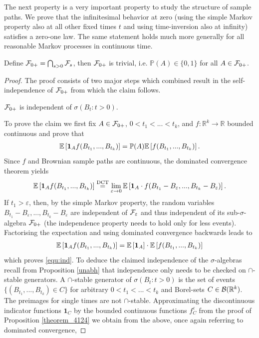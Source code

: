 The next property is a very important property to study the structure of sample paths. We prove that the infinitesimal behavior at zero (using the simple Markov property also at all other fixed times $t$ and using time-inversion also at infinity) satisfies a zero-one law. The same statement holds much more generally for all reasonable Markov processes in continuous time.
\begin{laussagewerkzeug}
\begin{theorem}
	Define $\mathcal{F}_{0+} =\bigcap_{s>0}\mathcal{F}_s$, then $\mathcal{F}_{0+}$ is trivial, i.e. $\mathbb{P}(A)\in\{0,1\}$ for all $A\in \mathcal{F}_{0+}$.
\end{theorem}
\end{laussagewerkzeug}
\begin{proof}[Proof]
	The proof consists of two major steps which combined result in the self-independence of $\mathcal{F}_{0+}$ from which the claim follows.
	\begin{lstep}
		$\mathcal{F}_{0+}$ is independent of $\sigma(B_t:t>0)$.
	\end{lstep}
	To prove the claim we first fix $A\in \mathcal{F}_{0+}$, $0 < t_1 < ... <t_k$, and $f\colon \mathbb{R}^k \to \mathbb{R}$ bounded continuous and prove that
	\begin{align}\label{equ:ind}
		\mathbb{E} \left[ \mathbf 1_A f(B_{t_1},...,B_{t_k}) \right]=\mathbb{P}(A) \mathbb{E} \left[ f(B_{t_1},...,B_{t_k})\right].
	\end{align}
	Since $f$ and Brownian sample paths are continuous, the dominated convergence theorem yields
	\begin{align*}
		\mathbb{E} \left[ \mathbf 1_A f(B_{t_1},...,B_{t_k}) \right] \overset{\text{DCT}}{=} \lim_{\varepsilon \to 0} \mathbb{E} \left[ \mathbf 1_A \cdot f(B_{t_1}-B_{\varepsilon},...,B_{t_k}-B_{\varepsilon})\right].
	\end{align*}
	If $t_1>\varepsilon$, then, by the simple Markov property, the random variables $B_{t_1}-B_{\varepsilon},...,B_{t_k}-B_{\varepsilon}$ are independent of $\mathcal{F}_{\varepsilon}$ and thus independent of its sub-$\sigma$-algebra $\mathcal{F}_{0+}$ (the independence property needs to hold only for less events). Factorising the expectation and using dominated convergence backwards leads to
	\begin{align*}
		\mathbb{E} \left[ \mathbf 1_A f(B_{t_1},...,B_{t_k}) \right]=  \mathbb{E} \left[ \mathbf 1_A \right] \cdot \mathbb{E}\left[f(B_{t_1},...,B_{t_k})\right]
	\end{align*}
	which proves \eqref{equ:ind}. To deduce the claimed independence of the $\sigma$-algebras recall from Proposition \ref{unabh} that independence only needs to be checked on $\cap$-stable generators. A $\cap$-stable generator of $\sigma(B_t:t>0)$ is the set of events $\{(B_{t_1},..., B_{t_k})\in C\}$ for arbitrary $0 < t_1 < ... <t_k$ and Borel-sets $C\in \mathcal B(\mathbb{R}^k)$. The preimages for single times are not $\cap$-stable. Approximating the discontinuous indicator functions $\mathbf 1_{C}$ by the bounded continuous functions $f^{\varepsilon}_C$ from the proof of Proposition \ref{theorem_4124} we obtain from the above, once again referring to dominated convergence, 

\end{proof}
